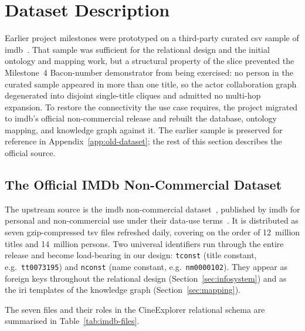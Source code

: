 \section{Dataset Description}
\label{sec:dataset}

Earlier project milestones were prototyped on a third-party curated \ac{csv} sample of \ac{imdb}~\cite{northcoder-blog,northcoder-repo}. That sample was sufficient for the relational design and the initial ontology and mapping work, but a structural property of the slice prevented the Milestone~4 Bacon-number demonstrator from being exercised: no person in the curated sample appeared in more than one title, so the actor collaboration graph degenerated into disjoint single-title cliques and admitted no multi-hop expansion. To restore the connectivity the use case requires, the project migrated to \ac{imdb}'s official non-commercial release and rebuilt the database, ontology mapping, and knowledge graph against it. The earlier sample is preserved for reference in Appendix~\ref{app:old-dataset}; the rest of this section describes the official source.

\subsection{The Official IMDb Non-Commercial Dataset}

The upstream source is the \ac{imdb} non-commercial dataset~\cite{imdb-noncommercial}, published by \ac{imdb} for personal and non-commercial use under their data-use terms~\cite{imdb-terms}. It is distributed as seven gzip-compressed \ac{tsv} files refreshed daily, covering on the order of 12~million titles and 14~million persons. Two universal identifiers run through the entire release and become load-bearing in our design: \texttt{tconst} (title constant, e.g.\ \texttt{tt0073195}) and \texttt{nconst} (name constant, e.g.\ \texttt{nm0000102}). They appear as foreign keys throughout the relational design (Section~\ref{sec:infosystem}) and as the \ac{iri} templates of the knowledge graph (Section~\ref{sec:mapping}).

The seven files and their roles in the CineExplorer relational schema are summarised in Table~\ref{tab:imdb-files}.

